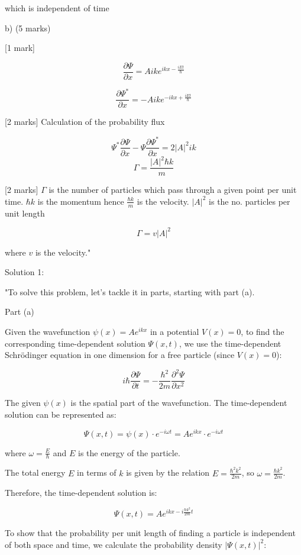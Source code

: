 which is independent of time

b) (5 marks)

[1 mark] 

\[ \frac{\partial \Psi}{\partial x} = Aik e^{ikx - \frac{iEt}{\hbar}} \] 

\[ \frac{\partial \Psi^{*}}{\partial x} = -Aik e^{-ikx + \frac{iEt}{\hbar}} \] 

[2 marks] Calculation of the probability flux

\[\Psi^{*}\frac{\partial \Psi}{\partial x} - \Psi\frac{\partial \Psi^{*}}{\partial x} = 2|A|^{2}ik\]
\[\Gamma = \frac{\left|A \right|^{2}\hbar k}{m} \]  

[2 marks] \( \Gamma \) is the number of particles which pass through a given point per unit time. \( \hbar k \) is the momentum hence \( \frac{\hbar k }{m} \) is the velocity.  \( |A|^2 \) is the no. particles per unit length

 \[\Gamma = v \left|A \right|^{2} \]  

where \(v\) is the velocity."

Solution 1:

"To solve this problem, let's tackle it in parts, starting with part (a).

Part (a)

Given the wavefunction \( \psi(x) = Ae^{ikx} \) in a potential \( V(x) = 0 \), to find the corresponding time-dependent solution \( \Psi(x,t) \), we use the time-dependent Schrödinger equation in one dimension for a free particle (since \( V(x) = 0 \)):

\[ i\hbar \frac{\partial \Psi}{\partial t} = -\frac{\hbar^2}{2m} \frac{\partial^2 \Psi}{\partial x^2} \]

The given \( \psi(x) \) is the spatial part of the wavefunction. The time-dependent solution can be represented as:

\[ \Psi(x,t) = \psi(x) \cdot e^{-i\omega t} = Ae^{ikx} \cdot e^{-i\omega t} \]

where \( \omega = \frac{E}{\hbar} \) and \( E \) is the energy of the particle.

The total energy \( E \) in terms of \( k \) is given by the relation \( E = \frac{\hbar^2k^2}{2m} \), so \( \omega = \frac{\hbar k^2}{2m} \).

Therefore, the time-dependent solution is:

\[ \Psi(x,t) = Ae^{ikx - i\frac{\hbar k^2}{2m}t} \]

To show that the probability per unit length of finding a particle is independent of both space and time, we calculate the probability density \( |\Psi(x,t)|^2 \):

